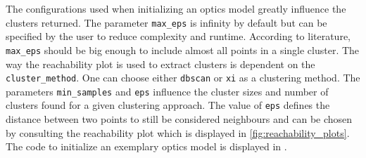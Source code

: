 The configurations used when initializing an \ac{optics} model greatly influence the clusters returned.
The parameter \texttt{max\_eps} is infinity by default but can be specified by the user to reduce complexity and runtime.
According to literature, \texttt{max\_eps} should be big enough to include almost all points in a single cluster.
The way the reachability plot is used to extract clusters is dependent on the \texttt{cluster\_method}. 
One can choose either \texttt{dbscan} or \texttt{xi} as a clustering method.
The parameters \texttt{min\_samples} and \texttt{eps} influence the cluster sizes and number of clusters found for a given clustering approach.
The value of \texttt{eps} defines the distance between two points to still be considered neighbours 
and can be chosen by consulting the reachability plot which is displayed in \autoref{fig:reachability_plots}.
The code to initialize an exemplary \ac{optics} model is displayed in .
